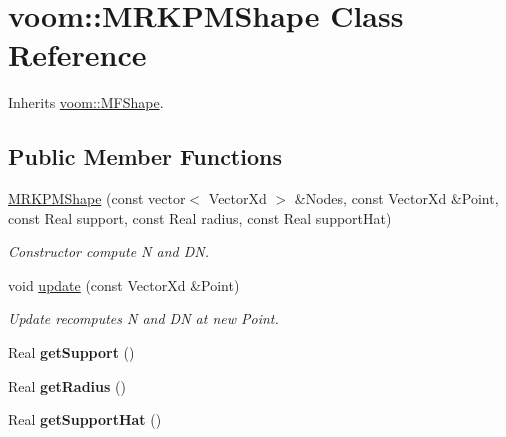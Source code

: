 \hypertarget{classvoom_1_1_m_r_k_p_m_shape}{
\section{voom::MRKPMShape Class Reference}
\label{classvoom_1_1_m_r_k_p_m_shape}
}


Inherits \hyperlink{classvoom_1_1_m_f_shape}{voom::MFShape}.\subsection*{Public Member Functions}
\begin{DoxyCompactItemize}
\item 
\hypertarget{classvoom_1_1_m_r_k_p_m_shape_a1a083165023e59673a416d676d5a4d87}{
\hyperlink{classvoom_1_1_m_r_k_p_m_shape_a1a083165023e59673a416d676d5a4d87}{MRKPMShape} (const vector$<$ VectorXd $>$ \&Nodes, const VectorXd \&Point, const Real support, const Real radius, const Real supportHat)}
\label{classvoom_1_1_m_r_k_p_m_shape_a1a083165023e59673a416d676d5a4d87}

\begin{DoxyCompactList}\small\item\em Constructor compute N and DN. \item\end{DoxyCompactList}\item 
\hypertarget{classvoom_1_1_m_r_k_p_m_shape_adcfd4786571f4915835963986f7d271e}{
void \hyperlink{classvoom_1_1_m_r_k_p_m_shape_adcfd4786571f4915835963986f7d271e}{update} (const VectorXd \&Point)}
\label{classvoom_1_1_m_r_k_p_m_shape_adcfd4786571f4915835963986f7d271e}

\begin{DoxyCompactList}\small\item\em Update recomputes N and DN at new Point. \item\end{DoxyCompactList}\item 
\hypertarget{classvoom_1_1_m_r_k_p_m_shape_afa24b33c965cb17f0df3ca4da2cf820f}{
Real {\bfseries getSupport} ()}
\label{classvoom_1_1_m_r_k_p_m_shape_afa24b33c965cb17f0df3ca4da2cf820f}

\item 
\hypertarget{classvoom_1_1_m_r_k_p_m_shape_a1a8235c58570e1df2dc8363731bbdbf5}{
Real {\bfseries getRadius} ()}
\label{classvoom_1_1_m_r_k_p_m_shape_a1a8235c58570e1df2dc8363731bbdbf5}

\item 
\hypertarget{classvoom_1_1_m_r_k_p_m_shape_a218f1199cb19eff3cbea7e8a325ef29c}{
Real {\bfseries getSupportHat} ()}
\label{classvoom_1_1_m_r_k_p_m_shape_a218f1199cb19eff3cbea7e8a325ef29c}


\end{DoxyCompactItemize}
